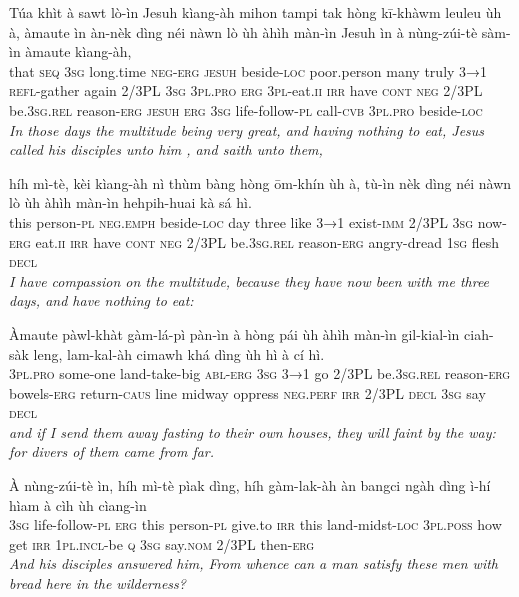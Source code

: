 \documentclass[11pt,a4paper]{article}
\begin{document}
\begin{exe}
\gll Túa khìt à sawt lò-ìn Jesuh kìang-àh mihon tampi tak hòng kī-khàwm leuleu ùh à, àmaute ìn àn-nèk dìng néi nàwn lò ùh àhìh màn-ìn Jesuh ìn à nùng-zúi-tè sàm-ìn àmaute kìang-àh, \\
     that \textsc{seq} \textsc{3sg} long.time \textsc{neg}-\textsc{erg} \textsc{jesuh} beside-\textsc{loc} poor.person many truly \textsc{3→1} \textsc{refl}-gather again 2/3PL \textsc{3sg} \textsc{3pl}.\textsc{pro} \textsc{erg} \textsc{3pl}-eat.\textsc{ii} \textsc{irr} have \textsc{cont} \textsc{neg} 2/3PL be.\textsc{3sg}.\textsc{rel} reason-\textsc{erg} \textsc{jesuh} \textsc{erg} \textsc{3sg} life-follow-\textsc{pl} call-\textsc{cvb} \textsc{3pl}.\textsc{pro} beside-\textsc{loc} \\
\glt \textcolor{kjvcolor}{\textit{In those days the multitude being very great, and having nothing to eat, Jesus called his disciples unto him , and saith unto them,}}

\gll híh mì-tè, kèi kìang-àh nì thùm bàng hòng ōm-khín ùh à, tù-ìn nèk dìng néi nàwn lò ùh àhìh màn-ìn hehpih-huai kà sá hì. \\
     this person-\textsc{pl} \textsc{neg}.\textsc{emph} beside-\textsc{loc} day three like \textsc{3→1} exist-\textsc{imm} 2/3PL \textsc{3sg} now-\textsc{erg} eat.\textsc{ii} \textsc{irr} have \textsc{cont} \textsc{neg} 2/3PL be.\textsc{3sg}.\textsc{rel} reason-\textsc{erg} angry-dread \textsc{1sg} flesh \textsc{decl} \\
\glt \textcolor{kjvcolor}{\textit{I have compassion on the multitude, because they have now been with me three days, and have nothing to eat:}}

\gll Àmaute pàwl-khàt gàm-lá-pì pàn-ìn à hòng pái ùh àhìh màn-ìn gil-kial-ìn ciah-sàk leng, lam-kal-àh cimawh khá dìng ùh hì à cí hì. \\
     \textsc{3pl}.\textsc{pro} some-one land-take-big \textsc{abl}-\textsc{erg} \textsc{3sg} \textsc{3→1} go 2/3PL be.\textsc{3sg}.\textsc{rel} reason-\textsc{erg} bowels-\textsc{erg} return-\textsc{caus} line midway oppress \textsc{neg}.\textsc{perf} \textsc{irr} 2/3PL \textsc{decl} \textsc{3sg} say \textsc{decl} \\
\glt \textcolor{kjvcolor}{\textit{and if I send them away fasting to their own houses, they will faint by the way: for divers of them came from far.}}

\gll À nùng-zúi-tè ìn, híh mì-tè pìak dìng, híh gàm-lak-àh àn bangci ngàh dìng ì-hí hìam à cìh ùh cìang-ìn \\
     \textsc{3sg} life-follow-\textsc{pl} \textsc{erg} this person-\textsc{pl} give.to \textsc{irr} this land-midst-\textsc{loc} \textsc{3pl}.\textsc{poss} how get \textsc{irr} \textsc{1pl}.\textsc{incl}-be \textsc{q} \textsc{3sg} say.\textsc{nom} 2/3PL then-\textsc{erg} \\
\glt \textcolor{kjvcolor}{\textit{And his disciples answered him, From whence can a man satisfy these men with bread here in the wilderness?}}


\end{exe}
\end{document}
